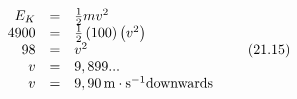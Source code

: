 {\begin{mdframed}[linewidth=4, leftmargin=40, rightmargin=40]
\begin{exercise}
\begin{enumerate}[noitemsep, label=\textbf{Step} \textbf{\arabic*}. ]
        \label{m38786*id69494}\nopagebreak\noindent{}
    \begin{equation}
    \begin{array}{ccc}\hfill {E}_{K}& =& \frac{1}{2}m{v}^{2}\hfill \\ \hfill 4900& =& \frac{1}{2}\left(100\right)\left({v}^{2}\right)\hfill \\ \hfill 98& =& {v}^{2}\hfill \\ \hfill v& =& 9,899...\hfill \\ \hfill v& =& 9,90\phantom{\rule{0.166667em}{0ex}}\mathrm{m}\ensuremath{\cdot}{\mathrm{s}}^{-1}\mathrm{downwards}\hfill \end{array}\tag{21.15}
      \end{equation}
        \end{enumerate}
    \end{exercise}
    \end{mdframed}
    }
    \noindent
\par
            \label{m38786*secfhsst!!!underscore!!!id2130}\vspace{.5cm} 
      \noindent
